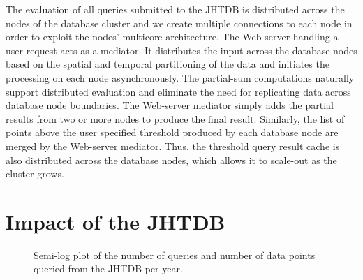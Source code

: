 \documentclass[10pt,twocolumn]{article}
\begin{document}
The evaluation of all queries submitted to the JHTDB is distributed across the nodes of the database cluster and we create multiple connections to each
node in order to exploit the nodes' multicore architecture. The Web-server handling a user request acts as a mediator. It distributes the input across the
database nodes based on the spatial and temporal partitioning of the data and initiates the processing on each node asynchronously. The partial-sum
computations naturally support distributed evaluation and eliminate the need
for replicating data across database node boundaries. The Web-server mediator simply adds the partial results from two or more nodes to produce the
final result. Similarly, the list of points above the user specified threshold produced by each database node are merged by the Web-server mediator. 
Thus, the threshold query result cache is also distributed across the database nodes, which allows it to scale-out as the cluster grows.

\section{Impact of the JHTDB}

\begin{figure}
\centering
{}
\caption{Semi-log plot of the number of queries and number of data points queried from the JHTDB per year.}
\label{fig:usage}
\end{figure}
\end{document}
